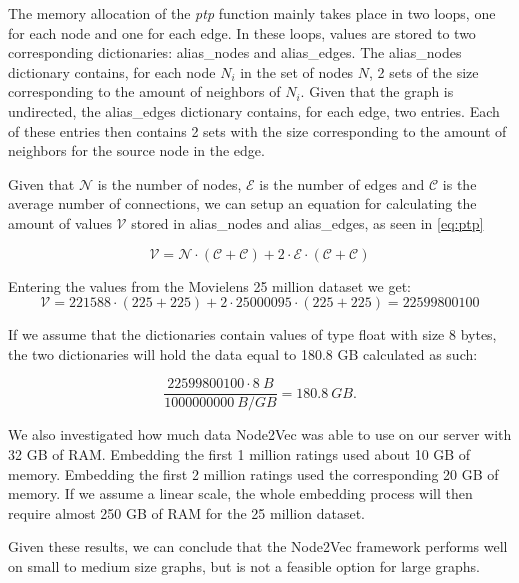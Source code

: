 The memory allocation of the \textit{ptp} function mainly takes place in two loops, one for each node and one for each edge.
In these loops, values are stored to two corresponding dictionaries: alias\_nodes and alias\_edges.
The alias\_nodes dictionary contains, for each node $N_i$ in the set of nodes $N$, 2 sets of the size corresponding to the amount of neighbors of $N_i$.
Given that the graph is undirected, the alias\_edges dictionary contains, for each edge, two entries. Each of these entries then contains 2 sets with the size corresponding to the amount of neighbors for the source node in the edge.

Given that $\mathcal{N}$ is the number of nodes, $\mathcal{E}$ is the number of edges and $\mathcal{C}$ is the average number of connections, we can setup an equation for calculating the amount of values $\mathcal{V}$ stored in alias\_nodes and alias\_edges, as seen in \autoref{eq:ptp}

\begin{equation}
  \label{eq:ptp}
  \mathcal{V} = \mathcal{N} \cdot (\mathcal{C} + \mathcal{C}) + 2 \cdot \mathcal{E} \cdot (\mathcal{C} + \mathcal{C})
\end{equation}

Entering the values from the Movielens 25 million dataset we get:
$$
\mathcal{V} = 221588 \cdot (225 + 225) + 2 \cdot 25000095 \cdot (225 + 225) = 22599800100
$$


If we assume that the dictionaries contain values of type float with size 8 bytes, the two dictionaries will hold the data equal to 180.8 GB calculated as such:

$$
  \frac{22599800100 \cdot 8 \ B}{1000000000 \ B/GB} = 180.8 \ GB.
$$

We also investigated how much data Node2Vec was able to use on our server with 32 GB of RAM. Embedding the first 1 million ratings used about 10 GB of memory. Embedding the first 2 million ratings used the corresponding 20 GB of memory. If we assume a linear scale, the whole embedding process will then require almost 250 GB of RAM for the 25 million dataset.

Given these results, we can conclude that the Node2Vec framework performs well on small to medium size graphs, but is not a feasible option for large graphs.


